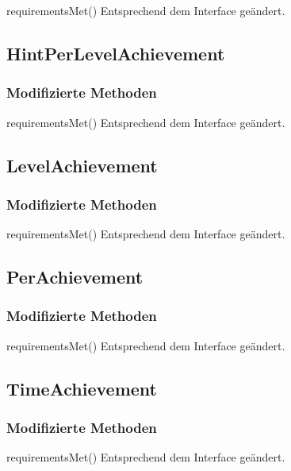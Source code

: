 \begin{description}
	\item{requirementsMet()}
	Entsprechend dem Interface geändert.
\end{description}

\subsection{HintPerLevelAchievement}

\subsubsection{Modifizierte Methoden}

\begin{description}
	\item{requirementsMet()}
	Entsprechend dem Interface geändert.
\end{description}

\subsection{LevelAchievement}

\subsubsection{Modifizierte Methoden}

\begin{description}
	\item{requirementsMet()}
	Entsprechend dem Interface geändert.
\end{description}

\subsection{PerAchievement}

\subsubsection{Modifizierte Methoden}

\begin{description}
	\item{requirementsMet()}
	Entsprechend dem Interface geändert.
\end{description}

\subsection{TimeAchievement}

\subsubsection{Modifizierte Methoden}

\begin{description}
	\item{requirementsMet()}
	Entsprechend dem Interface geändert.
\end{description}



